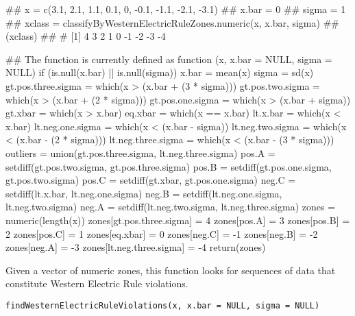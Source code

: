 \documentclass[a4paper]{book}
\begin{document}
\begin{Examples}
\begin{ExampleCode}
## x = c(3.1, 2.1, 1.1, 0.1, 0, -0.1, -1.1, -2.1, -3.1)
## x.bar = 0
## sigma = 1
## xclass = classifyByWesternElectricRuleZones.numeric(x, x.bar, sigma)
## (xclass)
## # [1]  4  3  2  1  0 -1 -2 -3 -4


## The function is currently defined as
function (x, x.bar = NULL, sigma = NULL) 
{
    if (is.null(x.bar) || is.null(sigma)) {
        x.bar = mean(x)
        sigma = sd(x)
    }
    gt.pos.three.sigma = which(x > (x.bar + (3 * sigma)))
    gt.pos.two.sigma = which(x > (x.bar + (2 * sigma)))
    gt.pos.one.sigma = which(x > (x.bar + sigma))
    gt.xbar = which(x > x.bar)
    eq.xbar = which(x == x.bar)
    lt.x.bar = which(x < x.bar)
    lt.neg.one.sigma = which(x < (x.bar - sigma))
    lt.neg.two.sigma = which(x < (x.bar - (2 * sigma)))
    lt.neg.three.sigma = which(x < (x.bar - (3 * sigma)))
    outliers = union(gt.pos.three.sigma, lt.neg.three.sigma)
    pos.A = setdiff(gt.pos.two.sigma, gt.pos.three.sigma)
    pos.B = setdiff(gt.pos.one.sigma, gt.pos.two.sigma)
    pos.C = setdiff(gt.xbar, gt.pos.one.sigma)
    neg.C = setdiff(lt.x.bar, lt.neg.one.sigma)
    neg.B = setdiff(lt.neg.one.sigma, lt.neg.two.sigma)
    neg.A = setdiff(lt.neg.two.sigma, lt.neg.three.sigma)
    zones = numeric(length(x))
    zones[gt.pos.three.sigma] = 4
    zones[pos.A] = 3
    zones[pos.B] = 2
    zones[pos.C] = 1
    zones[eq.xbar] = 0
    zones[neg.C] = -1
    zones[neg.B] = -2
    zones[neg.A] = -3
    zones[lt.neg.three.sigma] = -4
    return(zones)
  }
\end{ExampleCode}
\end{Examples}
%
\begin{Description}\relax
Given a vector of numeric zones, this function looks for sequences of data that constitute Western Electric Rule violations.

\end{Description}
%
\begin{Usage}
\begin{verbatim}
findWesternElectricRuleViolations(x, x.bar = NULL, sigma = NULL)
\end{verbatim}
\end{Usage}
\end{document}
